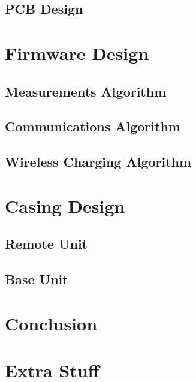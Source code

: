 \documentclass[draft]{IIBproject}
\begin{document}
%
%
%


%


%


%





\subsection{PCB Design}

\section{Firmware Design}

\subsection{Measurements Algorithm}

\subsection{Communications Algorithm}

\subsection{Wireless Charging Algorithm}

\section{Casing Design}

\subsection{Remote Unit}

\subsection{Base Unit}

\section{Conclusion}



\newpage


%

\appendix

\section{Extra Stuff}
\end{document}
